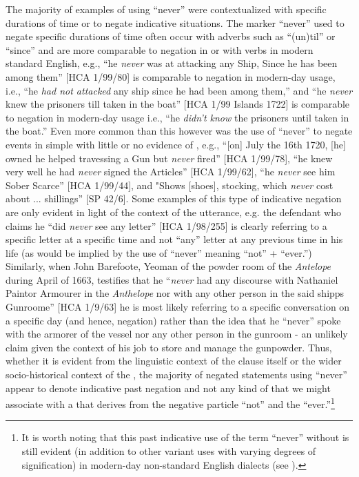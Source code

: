 The majority of examples of using “never” were contextualized with specific durations of time or to negate indicative  situations. The marker “never” used to negate specific durations of time often occur with adverbs such as “(un)til” or “since” and are more comparable to negation in  or with  verbs in modern standard English, e.g., “he \textit{never} was at attacking any Ship, Since he has been among them” [HCA 1/99/80] is comparable to  negation in modern-day usage, i.e., “he \textit{had not attacked} any ship since he had been among them,” and “he \textit{never} knew the prisoners till taken in the boat” [HCA 1/99  Islands 1722] is comparable to  negation in modern-day usage i.e., “he \textit{didn't know} the prisoners until taken in the boat.” Even more common than this however was the use of “never” to negate events in simple  with little or no evidence of , e.g., “[on] July the 16th 1720, [he] owned he helped travessing a Gun but \textit{never} fired” [HCA 1/99/78], “he knew very well he had \textit{never} signed the Articles” [HCA 1/99/62], “he \textit{never} see him Sober Scarce” [HCA 1/99/44], and "Shows [shoes], stocking, which \textit{never} cost about ... shillings” [SP 42/6]. Some examples of this type of indicative  negation are only evident in light of the context of the utterance, e.g. the defendant who claims he “did \textit{never} see any letter” [HCA 1/98/255] is clearly referring to a specific letter at a specific time and not “any” letter at any previous time in his life (as would be implied by the use of “never” meaning “not” + “ever.”) Similarly, when John Barefoote, Yeoman of the powder room of the \textit{Antelope} during April of 1663, testifies that he “\textit{never} had any discourse with Nathaniel Paintor Armourer in the \textit{Anthelope} nor with any other person in the said shipps Gunroome” [HCA 1/9/63] he is most likely referring to a specific conversation on a specific day (and hence,  negation) rather than the idea that he “never” spoke with the armorer of the vessel nor any other person in the gunroom - an unlikely claim given the context of his job to store and manage the gunpowder. Thus, whether it is evident from the linguistic context of the clause itself or the wider socio-historical context of the , the majority of negated statements using “never” appear to denote indicative past negation and not any kind of  that we might associate with a  that derives from the negative particle “not” and the  “ever.”\footnote{It is worth noting that this past indicative use of the term “never” without  is still evident (in addition to other variant uses with varying degrees of  signification) in modern-day non-standard English dialects (see \citealt{LucasWills2012}).}  

